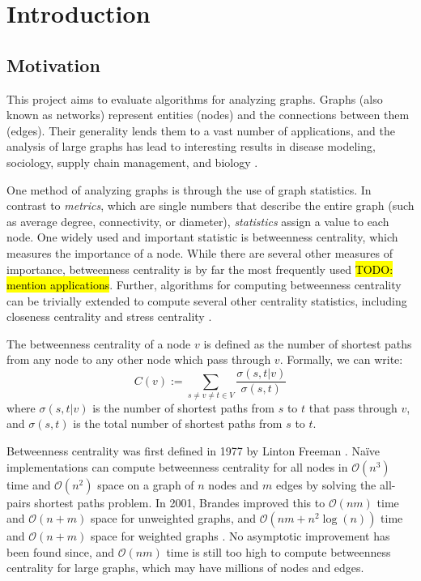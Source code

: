 \documentclass[a4paper,12pt]{article}
\begin{document}
\frenchspacing

\section{Introduction}
\subsection{Motivation}
This project aims to evaluate algorithms for analyzing graphs. Graphs (also known as networks) represent entities (nodes) and the connections between them (edges). Their generality lends them to a vast number of applications, and the analysis of large graphs has lead to interesting results in disease modeling, sociology, supply chain management, and biology \cite{disease}\cite{social}\cite{supply}\cite{bio}.

One method of analyzing graphs is through the use of graph statistics. In contrast to \textit{metrics}, which are single numbers that describe the entire graph (such as average degree, connectivity, or diameter), \textit{statistics} assign a value to each node. One widely used and important statistic is betweenness centrality, which measures the importance of a node. While there are several other measures of importance, betweenness centrality is by far the most frequently used \cite{geisberger} \hl{TODO: mention applications}. Further, algorithms for computing betweenness centrality can be trivially extended to compute several other centrality statistics, including closeness centrality and stress centrality \cite{brandes}.

The betweenness centrality of a node $v$ is defined as the number of shortest paths from any node to any other node which pass through $v$. Formally, we can write: \begin{equation} \label{eq:1}
C(v) := \sum_{s\neq v \neq t \in V} \frac{\sigma(s,t|v)}{\sigma(s,t)}
\end{equation}
where $\sigma(s,t|v)$ is the number of shortest paths from $s$ to $t$ that pass through $v$, and $\sigma(s,t)$ is the total number of shortest paths from $s$ to $t$.

Betweenness centrality was first defined in 1977 by Linton Freeman \cite{freeman}. Na\"{i}ve implementations can compute betweenness centrality for all nodes in $\mathcal{O}(n^3)$ time and $\mathcal{O}(n^2)$ space on a graph of $n$ nodes and $m$ edges by solving the all-pairs shortest paths problem. In 2001, Brandes improved this to $\mathcal{O}(nm)$ time and $\mathcal{O}(n+m)$ space for unweighted graphs, and $\mathcal{O}(nm+n^2\log(n))$ time and $\mathcal{O}(n+m)$ space for weighted graphs \cite{brandes}. No asymptotic improvement has been found since, and $\mathcal{O}(nm)$ time is still too high to compute betweenness centrality for large graphs, which may have millions of nodes and edges.
\end{document}
